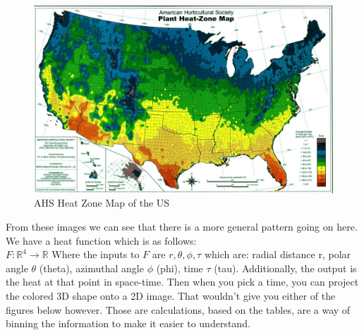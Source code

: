 \documentclass[10pt]{extarticle}
\begin{document}
\begin{figure}
	\includegraphics[width=\linewidth]{Heat_Zone_Map_USA.jpg}
	\caption{AHS Heat Zone Map of the US}
	\label{fig:AHS Heat Zone Map}
\end{figure}

\newpage
From these images we can see that there is a more general pattern going on here. 
We have a heat function which is as follows: \\ 
$F : \mathbb{R}^4 \to \mathbb{R}$
Where the inputs to $F$ are $r,\theta,\phi,\tau$ which are: radial distance r, polar angle $\theta$ (theta), azimuthal angle $\phi$ (phi), time $\tau$ (tau). Additionally, the output is the heat at that point in space-time. 
Then when you pick a time, you can project the colored 3D shape onto a 2D image. That wouldn't give you either of the figures below however. Those are calculations, based on the tables, are a way of binning the information to make it easier to understand. 
\end{document}
